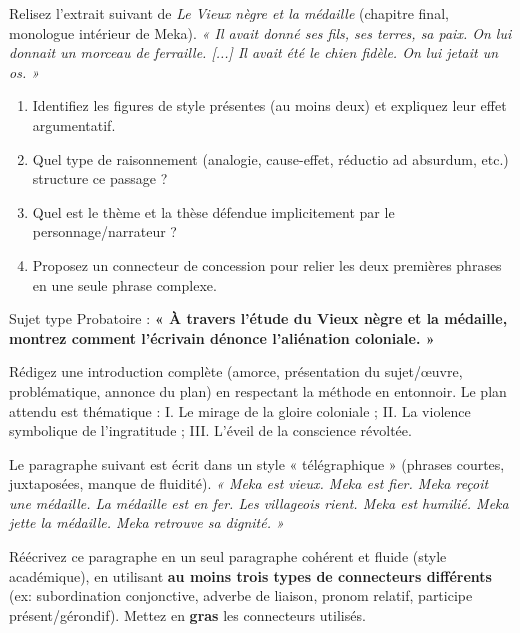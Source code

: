 \documentclass[11pt]{article}
\newcommand{\cle}[1]{{\popxbold\color{popdark}#1}}
\newcounter{popsec}
\newcounter{popsub}
\newcommand{\courssub}[1]{%
  \stepcounter{popsub}%
  \par\vspace{9pt}\noindent{\popxbold\fontsize{11.5}{13}\selectfont\color{popink}{\color{poporange}\thepopsec.\thepopsub}\hspace{6pt}#1}\par\nopagebreak\vspace{4pt}
}
\begin{document}
\courssub{Je m'entraîne}

\begin{exercice}
Relisez l'extrait suivant de \emph{Le Vieux nègre et la médaille} (chapitre final, monologue intérieur de Meka). 
\textit{« Il avait donné ses fils, ses terres, sa paix. On lui donnait un morceau de ferraille. [...] Il avait été le chien fidèle. On lui jetait un os. »}

\begin{enumerate}
\item Identifiez les figures de style présentes (au moins deux) et expliquez leur effet argumentatif.
\item Quel type de raisonnement (analogie, cause-effet, réductio ad absurdum, etc.) structure ce passage ?
\item Quel est le \cle{thème} et la \cle{thèse} défendue implicitement par le personnage/narrateur ?
\item Proposez un connecteur de concession pour relier les deux premières phrases en une seule phrase complexe.
\end{enumerate}
\end{exercice}

\begin{exercice}
Sujet type Probatoire : \textbf{« À travers l'étude du Vieux nègre et la médaille, montrez comment l'écrivain dénonce l'aliénation coloniale. »}

Rédigez une introduction complète (amorce, présentation du sujet/œuvre, problématique, annonce du plan) en respectant la méthode en entonnoir. Le plan attendu est thématique : 
I. Le mirage de la gloire coloniale ; 
II. La violence symbolique de l'ingratitude ; 
III. L'éveil de la conscience révoltée.
\end{exercice}

\begin{exercice}
Le paragraphe suivant est écrit dans un style « télégraphique » (phrases courtes, juxtaposées, manque de fluidité). 
\textit{« Meka est vieux. Meka est fier. Meka reçoit une médaille. La médaille est en fer. Les villageois rient. Meka est humilié. Meka jette la médaille. Meka retrouve sa dignité. »}

Réécrivez ce paragraphe en un seul paragraphe cohérent et fluide (style académique), en utilisant \textbf{au moins trois types de connecteurs différents} (ex: subordination conjonctive, adverbe de liaison, pronom relatif, participe présent/gérondif). Mettez en \textbf{gras} les connecteurs utilisés.
\end{exercice}
\end{document}

